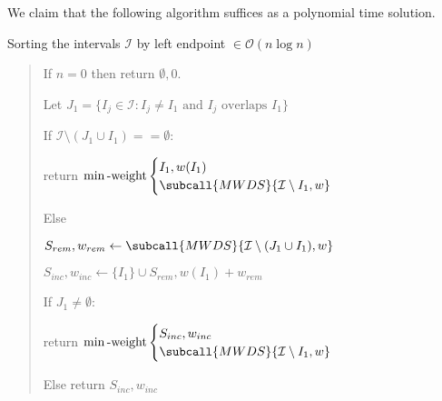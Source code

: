 \documentclass{article}
\begin{document}
\begin{solution}
We claim that the following algorithm suffices as a polynomial time solution.
\begin{subproof}[Preprocessing]
    Sorting the intervals \( \mathcal{I} \) by left endpoint \( \in \mathcal{O}(n\log n) \)
\end{subproof}

\begin{subproof}[Algorithm]

\begin{quote}%

\begin{steps}
    \item If \( n = 0 \) then return \( \emptyset, 0 \).
    \item Let \( J_1 = \{I_j \in \mathcal{I} : I_j\neq I_1 \text{ and } I_j \text{ overlaps } I_1\} \)
    \item If \( \mathcal{I} \setminus (J_1 \cup {I_1}) == \emptyset \):
    \begin{steps}
        \item return $ \min\text{-weight} \begin{cases}
            I_1, w(I_1)\\
            \subcall{MWDS}{\mathcal{I} \setminus {I_1},w}
        \end{cases}$
    \end{steps}
    \item Else
    \begin{steps}
    \item \( S_{rem}, w_{rem}\leftarrow \subcall{MWDS}{\mathcal{I} \setminus (J_1 \cup {I_1}), w} \)
        \item \( S_{inc}, w_{inc}\leftarrow \{I_1\} \cup S_{rem} , w(I_1) + w_{rem} \)
        \item If \( J_1 \neq \emptyset \):
        \begin{steps}
            \item return $ \min\text{-weight} \begin{cases}
           S_{inc},w_{inc}\\
            \subcall{MWDS}{\mathcal{I} \setminus {I_1},w}
        \end{cases}$
        \end{steps}
        \item Else return \( S_{inc},w_{inc} \)


\end{steps}
\end{steps}
\end{quote}
\end{subproof}
\end{solution}
\end{document}
